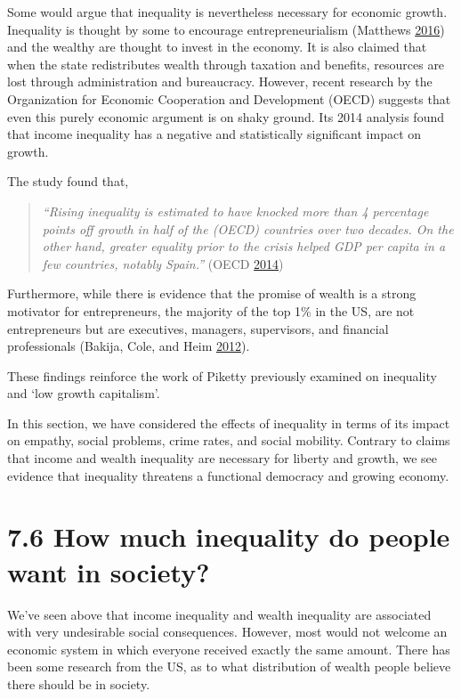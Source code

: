 \documentclass[]{tufte-handout}
\begin{document}
Some would argue that inequality is nevertheless necessary for economic
growth. Inequality is thought by some to encourage entrepreneurialism
(Matthews \protect\hyperlink{ref-Matthews2016}{2016}) and the wealthy
are thought to invest in the economy. It is also claimed that when the
state redistributes wealth through taxation and benefits, resources are
lost through administration and bureaucracy. However, recent research by
the Organization for Economic Cooperation and Development (OECD)
suggests that even this purely economic argument is on shaky ground. Its
2014 analysis found that income inequality has a negative and
statistically significant impact on growth.

The study found that,

\begin{quote}
\emph{``Rising inequality is estimated to have knocked more than 4
percentage points off growth in half of the (OECD) countries over two
decades. On the other hand, greater equality prior to the crisis helped
GDP per capita in a few countries, notably Spain.''} (OECD
\protect\hyperlink{ref-OE2014}{2014})
\end{quote}

Furthermore, while there is evidence that the promise of wealth is a
strong motivator for entrepreneurs, the majority of the top 1\% in the
US, are not entrepreneurs but are executives, managers, supervisors, and
financial professionals (Bakija, Cole, and Heim
\protect\hyperlink{ref-Bakija2012}{2012}).

These findings reinforce the work of Piketty previously examined on
inequality and `low growth capitalism'.

In this section, we have considered the effects of inequality in terms
of its impact on empathy, social problems, crime rates, and social
mobility. Contrary to claims that income and wealth inequality are
necessary for liberty and growth, we see evidence that inequality
threatens a functional democracy and growing economy.

\hypertarget{how-much-inequality-do-people-want-in-society}{%
\section{7.6 How much inequality do people want in
society?}\label{how-much-inequality-do-people-want-in-society}}

We've seen above that income inequality and wealth inequality are
associated with very undesirable social consequences. However, most
would not welcome an economic system in which everyone received exactly
the same amount. There has been some research from the US, as to what
distribution of wealth people believe there should be in society.
\end{document}
